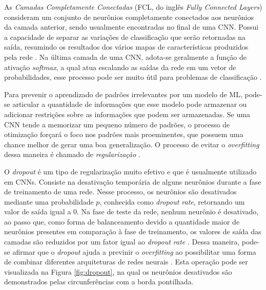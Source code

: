 
As \emph{Camadas Completamente Conectadas} (FCL, do inglês \emph{Fully Connected Layers}) consideram um conjunto de neurônios completamente conectados aos neurônios da camada anterior, sendo usualmente encontradas no final de uma CNN. Possui a capacidade de separar as variações de classificação que serão retornadas na saída, resumindo os resultados dos vários mapas de características produzidos pela rede \cite{khan}. Na última camada de uma CNN, adota-se geralmente a função de ativação \emph{softmax}, a qual atua escalando as saídas da rede em um vetor de probabilidades, esse processo pode ser muito útil para problemas de classificação \cite{gulli}.

Para prevenir o aprendizado de padrões irrelevantes por um modelo de ML, pode-se articular a quantidade de informações que esse modelo pode armazenar ou adicionar restrições sobre as informações que podem ser armazenadas. Se uma CNN tende a memorizar um pequeno número de padrões, o processo de otimização forçará o foco nos padrões mais proeminentes, que possuem uma chance melhor de gerar uma boa generalização. O processo de evitar o \emph{overfitting} dessa maneira é chamado de \emph{regularização} \cite{chollet}.

O \emph{dropout} é um tipo de regularização muito efetivo e que é usualmente utilizado em CNNs. Consiste na desativação temporária de alguns neurônios durante a fase de treinamento de uma rede. Nesse processo, os neurônios são desativados mediante uma probabilidade $p$, conhecida como \emph{dropout rate}, retornando um valor de saída igual a $0$. Na fase de teste da rede, nenhum neurônio é desativado, ao passo que, como forma de balanceamento devido a quantidade maior de neurônios presentes em comparação à fase de treinamento, os valores de saída das camadas são reduzidos por um fator igual ao \emph{dropout rate} \cite{chollet}. Dessa maneira, pode-se afirmar que o \emph{dropout} ajuda a previnir o \emph{overfitting} ao possibilitar uma forma de combinar diferentes arquiteturas de redes neurais \cite{buduma}. Esta operação pode ser visualizada na Figura \ref{fig:dropout}, na qual os neurônios desativados são demonstrados pelas circunferências com a borda pontilhada.

